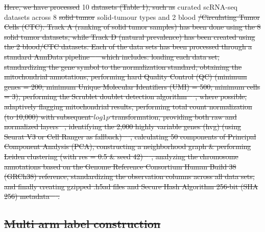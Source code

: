 \documentclass[10pt]{article}
\providecommand{\DIFaddtex}[1]{{\protect\color{trackgreen}#1}} %
\providecommand{\DIFdeltex}[1]{{\protect\color{red}\sout{#1}}}                      %
\providecommand{\DIFaddbegin}{} %
\providecommand{\DIFaddend}{} %
\providecommand{\DIFdelbegin}{} %
\providecommand{\DIFdelend}{} %
\providecommand{\DIFadd}[1]{\texorpdfstring{\DIFaddtex{#1}}{#1}} %
\providecommand{\DIFdel}[1]{\texorpdfstring{\DIFdeltex{#1}}{}} %
\newcommand{\DIFscaledelfig}{0.5}
\newlength{\DIFdelgraphicswidth} %
\newlength{\DIFdelgraphicsheight} %
\newcommand{\DIFaddincludegraphics}[2][]{{\color{trackgreen}\fbox{\DIFOincludegraphics[#1]{#2}}}} %
\newcommand{\DIFdelincludegraphics}[2][]{%
\sbox{\DIFdelgraphicsbox}{\DIFOincludegraphics[#1]{#2}}%
\settoboxwidth{\DIFdelgraphicswidth}{\DIFdelgraphicsbox} %
\settoboxtotalheight{\DIFdelgraphicsheight}{\DIFdelgraphicsbox} %
\scalebox{\DIFscaledelfig}{%
\parbox[b]{\DIFdelgraphicswidth}{\usebox{\DIFdelgraphicsbox}\\[-\baselineskip] \rule{\DIFdelgraphicswidth}{0em}}\llap{\resizebox{\DIFdelgraphicswidth}{\DIFdelgraphicsheight}{%
\setlength{\unitlength}{\DIFdelgraphicswidth}%
\begin{picture}(1,1)%
\thicklines\linethickness{2pt} %
{\color[rgb]{1,0,0}\put(0,0){\framebox(1,1){}}}%
{\color[rgb]{1,0,0}\put(0,0){\line( 1,1){1}}}%
{\color[rgb]{1,0,0}\put(0,1){\line(1,-1){1}}}%
\end{picture}%
}\hspace*{3pt}}} %
} %
\DeclareRobustCommand{\DIFaddbegin}{\DIFOaddbegin \let\includegraphics\DIFaddincludegraphics} %
\DeclareRobustCommand{\DIFaddend}{\DIFOaddend \let\includegraphics\DIFOincludegraphics} %
\DeclareRobustCommand{\DIFdelbegin}{\DIFOdelbegin \let\includegraphics\DIFdelincludegraphics} %
\DeclareRobustCommand{\DIFdelend}{\DIFOaddend \let\includegraphics\DIFOincludegraphics} %
\begin{document}
\DIFdelbegin \DIFdel{Here, we have processed }\DIFdelend 10 \DIFdelbegin \DIFdel{datasets (Table 1), such as }\DIFdelend \DIFaddbegin \DIFadd{curated scRNA-seq datasets across }\DIFaddend 8 \DIFdelbegin \DIFdel{solid tumor }\DIFdelend \DIFaddbegin \DIFadd{solid-tumour types }\DIFaddend and 2 blood
\DIFdelbegin \DIFdel{/Circulating Tumor Cells (CTC). Track A (ranking of solid tumor samples) has been done using the 8 solid tumor datasets, while Track D (natural prevalence) has been created using the 2 blood/CTC datasets. Each of the data sets has been processed through a standard AnnData pipeline \mbox{%
\cite{jovic2022single} }\hskip0pt%
which includes:
loading each data set, standardizing the gene symbol to the normalization standard, obtaining the mitochondrial annotations, performing hard Quality Control (QC) (minimum genes = 200; minimum Unique Molecular Identifiers (UMI) = 500; minimum cells = 3), performing the Scrublet doublet detection algorithm \mbox{%
\cite{jovic2022single}}\hskip0pt%
, where possible, adaptively flagging mitochondrial results, performing total count normalization (to 10,000) with subsequent $log 1p$ transformation, providing both raw and normalized layers\mbox{%
\cite{tran2020benchmark}}\hskip0pt%
, identifying the 2,000 highly variable genes (hvg) (using Seurat V3 or Cell Ranger as fallback) \mbox{%
\cite{tran2020benchmark,abdelaal2019comparison}}\hskip0pt%
, calculating 50 components of Principal Component Analysis (PCA), constructing a neighborhood graph \& performing Leiden clustering (with res = 0.5 \& seed 42) \mbox{%
\cite{mahalanabis2022evaluation}}\hskip0pt%
, analyzing the chromosome annotations based on the Genome Reference Consortium Human Build 38 (GRCh38) reference, standardizing the observation columns across all data sets, and finally creating gzipped .h5ad files and Secure Hash Algorithm 256-bit (SHA 256) metadata \mbox{%
\cite{cao2021benchmark}}\hskip0pt%
.
}%

\subsection{\DIFdel{Multi arm label construction}}
\addtocounter{subsection}{-1}%
\end{document}
